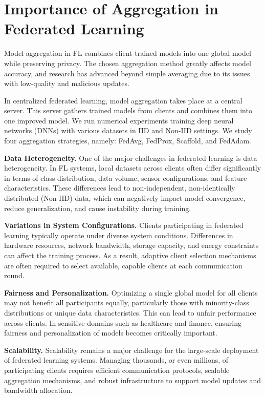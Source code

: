 \documentclass[12pt]{book}
\begin{document}
\section{Importance of Aggregation in Federated Learning}

Model aggregation in FL combines client-trained models into one global model while preserving privacy. The chosen aggregation method greatly affects model accuracy, and research has advanced beyond simple averaging due to its issues with low-quality and malicious updates.

In centralized federated learning, model aggregation takes place at a central server. This server gathers trained models from clients and combines them into one improved model.
We run numerical experiments training deep neural networks (DNNs) with various datasets in IID and Non-IID settings. We study four aggregation strategies, namely: FedAvg, FedProx, Scaffold, and FedAdam.

\textbf{Data Heterogeneity.}
One of the major challenges in federated learning is data heterogeneity. In FL systems, local datasets across clients often differ significantly in terms of class distribution, data volume, sensor configurations, and feature characteristics. These differences lead to non-independent, non-identically distributed (Non-IID) data, which can negatively impact model convergence, reduce generalization, and cause instability during training.

\textbf{Variations in System Configurations.}
Clients participating in federated learning typically operate under diverse system conditions. Differences in hardware resources, network bandwidth, storage capacity, and energy constraints can affect the training process. As a result, adaptive client selection mechanisms are often required to select available, capable clients at each communication round.

\textbf{Fairness and Personalization.}
Optimizing a single global model for all clients may not benefit all participants equally, particularly those with minority-class distributions or unique data characteristics. This can lead to unfair performance across clients. In sensitive domains such as healthcare and finance, ensuring fairness and personalization of models becomes critically important.

\textbf{Scalability.}
Scalability remains a major challenge for the large-scale deployment of federated learning systems. Managing thousands, or even millions, of participating clients requires efficient communication protocols, scalable aggregation mechanisms, and robust infrastructure to support model updates and bandwidth allocation.
\end{document}
